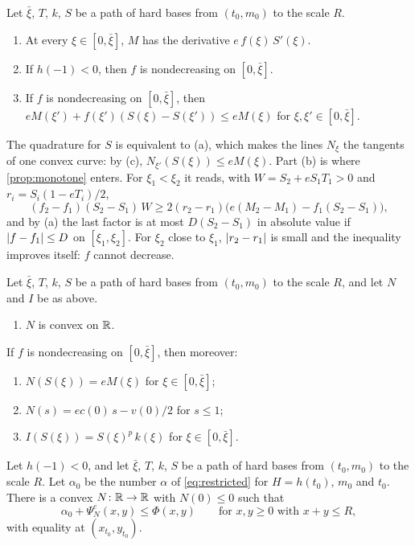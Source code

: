 \begin{lemma}\label{lem:path}
Let $\bar\xi$, $T$, $k$, $S$ be a path of hard bases from $(t_0,m_0)$ to the scale $R$.
\begin{enumerate}[label=\textup{(\alph*)}]
\item At every $\xi\in[0,\bar\xi]$, $M$ has the derivative $e\,f(\xi)\,S'(\xi)$.
\item If $h(-1)<0$, then $f$ is nondecreasing on $[0,\bar\xi]$.
\item If $f$ is nondecreasing on $[0,\bar\xi]$, then
  $eM(\xi')+f(\xi')(S(\xi)-S(\xi'))\le eM(\xi)$ for $\xi,\xi'\in[0,\bar\xi]$.
\end{enumerate}
\end{lemma}

The quadrature for $S$ is equivalent to (a), which makes the lines $N_\xi$ the tangents of one
convex curve: by (c), $N_{\xi'}(S(\xi))\le eM(\xi)$. Part (b) is where \cref{prop:monotone}
enters. For $\xi_1<\xi_2$ it reads, with $W=S_2+eS_1T_1>0$ and $r_i=S_i(1-eT_i)/2$,
\[
  (f_2-f_1)(S_2-S_1)\,W\ge2(r_2-r_1)\bigl(e(M_2-M_1)-f_1(S_2-S_1)\bigr),
\]
and by (a) the last factor is at most $D(S_2-S_1)$ in absolute value if $\lvert f-f_1\rvert\le D$ on
$[\xi_1,\xi_2]$. For $\xi_2$ close to $\xi_1$, $\lvert r_2-r_1\rvert$ is small and the inequality
improves itself: $f$ cannot decrease.

\begin{lemma}\label{lem:envelope}
Let $\bar\xi$, $T$, $k$, $S$ be a path of hard bases from $(t_0,m_0)$ to the scale $R$, and let
$N$ and $I$ be as above.
\begin{enumerate}[label=\textup{(\alph*)}]
\item $N$ is convex on $\mathbb{R}$.
\end{enumerate}
If $f$ is nondecreasing on $[0,\bar\xi]$, then moreover:
\begin{enumerate}[label=\textup{(\alph*)},start=2]
\item $N(S(\xi))=eM(\xi)$ for $\xi\in[0,\bar\xi]$;
\item $N(s)=ec(0)\,s-v(0)/2$ for $s\le1$;
\item $I(S(\xi))=S(\xi)^p\,k(\xi)$ for $\xi\in[0,\bar\xi]$.
\end{enumerate}
\end{lemma}

\begin{proposition}\label{prop:minorant}
Let $h(-1)<0$, and let $\bar\xi$, $T$, $k$, $S$ be a path of hard bases from $(t_0,m_0)$ to the
scale $R$. Let $\alpha_0$ be the number $\alpha$ of \eqref{eq:restricted} for $H=h(t_0)$, $m_0$
and $t_0$. There is a convex $N\colon\mathbb{R}\to\mathbb{R}$ with $N(0)\le0$ such that
\[
  \alpha_0+\Psi^e_N(x,y)\le\Phi(x,y)\qquad\text{for }x,y\ge0\text{ with }x+y\le R,
\]
with equality at $(x_{t_0},y_{t_0})$.
\end{proposition}

